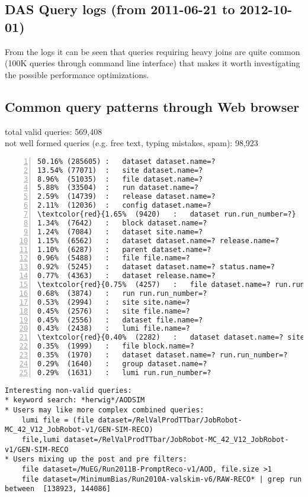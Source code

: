 \begin{appendix}
\section{DAS Query logs (from 2011-06-21 to 2012-10-01)}

From the logs it can be seen that queries requiring heavy joins are quite common (100K queries through command line interface) that makes it worth investigating the possible performance optimizations.

\subsection{Common query patterns through Web browser}
total valid queries: 569,408
\\
not well formed queries (e.g. free text, typing mistakes, spam): 98,923

\begin{Verbatim}[commandchars=\\\{\},numbers=left,numbersep=4pt]
50.16% (285605)	:	dataset dataset.name=?
13.54% (77071)	:	site dataset.name=?
8.96%  (51035)	:	file dataset.name=?
5.88%  (33504)	:	run dataset.name=?
2.59%  (14739)	:	release dataset.name=?
2.11%  (12036)	:	config dataset.name=?
\textcolor{red}{1.65%  (9420) 	:	dataset run.run_number=?}
1.34%  (7642) 	:	block dataset.name=?
1.24%  (7084) 	:	dataset site.name=?
1.15%  (6562) 	:	dataset dataset.name=? release.name=?
1.10%  (6287) 	:	parent dataset.name=?
0.96%  (5488) 	:	file file.name=?
0.92%  (5245) 	:	dataset dataset.name=? status.name=?
0.77%  (4363) 	:	dataset release.name=?
\textcolor{red}{0.75%  (4257) 	:	file dataset.name=? run.run_number=?}
0.68%  (3874) 	:	run run.run_number=?
0.53%  (2994) 	:	site site.name=?
0.45%  (2576) 	:	site file.name=?
0.45%  (2556) 	:	dataset file.name=?
0.43%  (2438) 	:	lumi file.name=?
\textcolor{red}{0.40%  (2282) 	:	dataset dataset.name=? site.name=?}
0.35%  (1999) 	:	file block.name=?
0.35%  (1970) 	:	dataset dataset.name=? run.run_number=?
0.29%  (1640) 	:	group dataset.name=?
0.29%  (1631) 	:	lumi run.run_number=?
\end{Verbatim}

\begin{verbatim}
Interesting non-valid queries:
* keyword search: *herwig*/AODSIM
* Users may like more complex combined queries:
    lumi file = (file dataset=/RelValProdTTbar/JobRobot-MC_42_V12_JobRobot-v1/GEN-SIM-RECO)
    file,lumi dataset=/RelValProdTTbar/JobRobot-MC_42_V12_JobRobot-v1/GEN-SIM-RECO
* Users mixing up the post and pre filters:
    file dataset=/MuEG/Run2011B-PromptReco-v1/AOD, file.size >1
    file dataset=/MinimumBias/Run2010A-valskim-v6/RAW-RECO* | grep run between  [138923, 144086] 
\end{verbatim}
\newpage

\end{appendix}
